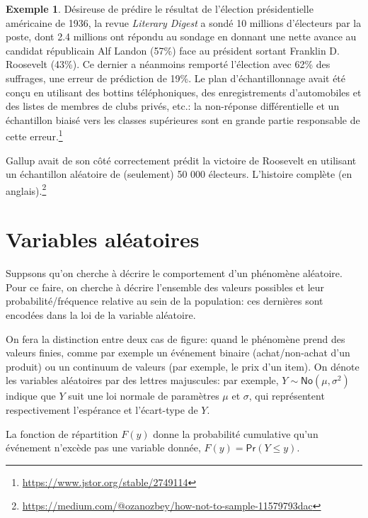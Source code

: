 \documentclass[
  11pt,
  letterpaper,
]{book}
\renewcommand{\href}[2]{#2\footnote{\url{#1}}}
\theoremstyle{definition}
\theoremstyle{definition}
\newtheorem{example}{Exemple}[chapter]
\theoremstyle{definition}
\theoremstyle{remark}
\begin{document}
\begin{example}
\protect\hypertarget{exm:Galluppoll}{}{\label{exm:Galluppoll} }
Désireuse de prédire le résultat de l'élection présidentielle américaine de 1936, la revue \emph{Literary Digest} a sondé 10 millions d'électeurs par la poste, dont 2.4 millions ont répondu au sondage en donnant une nette avance au candidat républicain Alf Landon (57\%) face au président sortant Franklin D. Roosevelt (43\%). Ce dernier a néanmoins remporté l'élection avec 62\% des suffrages, une erreur de prédiction de 19\%. Le plan d'échantillonnage avait été conçu en utilisant des bottins téléphoniques, des enregistrements d'automobiles et des listes de membres de clubs privés, etc.: \href{https://www.jstor.org/stable/2749114}{la non-réponse différentielle et un échantillon biaisé vers les classes supérieures sont en grande partie responsable de cette erreur.}

Gallup avait de son côté correctement prédit la victoire de Roosevelt en utilisant un échantillon aléatoire de (seulement) 50 000 électeurs. \href{https://medium.com/@ozanozbey/how-not-to-sample-11579793dac}{L'histoire complète (en anglais).}
\end{example}

\hypertarget{variable-aleatoire}{%
\section{Variables aléatoires}\label{variable-aleatoire}}

Suppsons qu'on cherche à décrire le comportement d'un phénomène aléatoire. Pour ce faire, on cherche à décrire l'ensemble des valeurs possibles et leur probabilité/fréquence relative au sein de la population: ces dernières sont encodées dans la loi de la variable aléatoire.

On fera la distinction entre deux cas de figure: quand le phénomène prend des valeurs finies, comme par exemple un événement binaire (achat/non-achat d'un produit) ou un continuum de valeurs (par exemple, le prix d'un item). On dénote les variables aléatoires par des lettres majuscules: par exemple, \(Y \sim \mathsf{No}(\mu, \sigma^2)\) indique que \(Y\) suit une loi normale de paramètres \(\mu\) et \(\sigma\), qui représentent respectivement l'espérance et l'écart-type de \(Y\).

La fonction de répartition \(F(y)\) donne la probabilité cumulative qu'un événement n'excède pas une variable donnée, \(F(y) = \mathsf{Pr}(Y \leq y)\).
\end{document}
